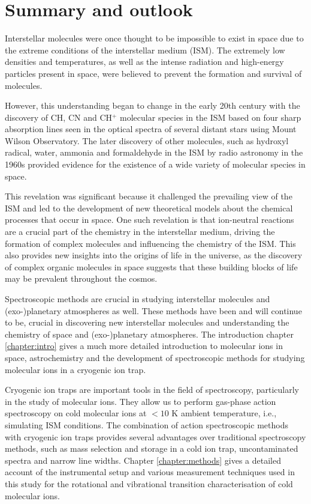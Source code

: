 \chapter{Summary and outlook}
Interstellar molecules were once thought to be impossible to exist in space due to the extreme conditions of the interstellar medium (ISM). The extremely low densities and temperatures, as well as the intense radiation and high-energy particles present in space, were believed to prevent the formation and survival of molecules.

However, this understanding began to change in the early 20th century with the discovery of CH, CN and CH$^+$ molecular species in the ISM based on four sharp absorption lines seen in the optical spectra of several distant stars using Mount Wilson Observatory. The later discovery of other molecules, such as hydroxyl radical, water, ammonia and formaldehyde in the ISM by radio astronomy in the 1960s provided evidence for the existence of a wide variety of molecular species in space.

This revelation was significant because it challenged the prevailing view of the ISM and led to the development of new theoretical models about the chemical processes that occur in space. One such revelation is that ion-neutral reactions are a crucial part of the chemistry in the interstellar medium, driving the formation of complex molecules and influencing the chemistry of the ISM. This also provides new insights into the origins of life in the universe, as the discovery of complex organic molecules in space suggests that these building blocks of life may be prevalent throughout the cosmos.

Spectroscopic methods are crucial in studying interstellar molecules and (exo-)planetary atmospheres as well. These methods have been and will continue to be, crucial in discovering new interstellar molecules and understanding the chemistry of space and (exo-)planetary atmospheres. The introduction chapter \ref{chapter:intro} gives a much more detailed introduction to molecular ions in space, astrochemistry and the development of spectroscopic methods for studying molecular ions in a cryogenic ion trap.

Cryogenic ion traps are important tools in the field of spectroscopy, particularly in the study of molecular ions. They allow us to perform gas-phase action spectroscopy on cold molecular ions at $< 10$ K ambient temperature, i.e., simulating ISM conditions. The combination of action spectroscopic methods with cryogenic ion traps provides several advantages over traditional spectroscopy methods, such as mass selection and storage in a cold ion trap, uncontaminated spectra and narrow line widths. Chapter \ref{chapter:methods} gives a detailed account of the instrumental setup and various measurement techniques used in this study for the rotational and vibrational transition characterisation of cold molecular ions.

